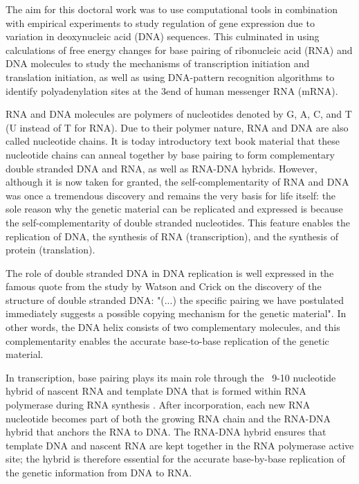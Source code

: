 %
The aim for this doctoral work was to use computational tools in combination
with empirical experiments to study regulation of gene expression due to
variation in deoxynucleic acid (DNA) sequences. This culminated in using
calculations of free energy changes for base pairing of ribonucleic acid (RNA)
and DNA molecules to study the mechanisms of transcription initiation and
translation initiation, as well as using DNA-pattern recognition algorithms to
identify polyadenylation sites at the 3\ppp end of human messenger RNA (mRNA).

RNA and DNA molecules are polymers of nucleotides denoted by G, A, C, and T (U
instead of T for RNA). Due to their polymer nature, RNA and DNA are also called
nucleotide chains. It is today introductory text book material that these
nucleotide chains can anneal together by base pairing to form complementary
double stranded DNA and RNA, as well as RNA-DNA hybrids. However, although it
is now taken for granted, the self-complementarity of RNA and DNA was once a
tremendous discovery and remains the very basis for life itself: the sole
reason why the genetic material can be replicated and expressed is because
the self-complementarity of double stranded nucleotides. This feature enables
the replication of DNA, the synthesis of RNA (transcription), and the synthesis
of protein (translation).

The role of double stranded DNA in DNA replication is well expressed in the
famous quote from the study by Watson and Crick \cite{watson_molecular_1953} on
the discovery of the structure of double stranded DNA: "(...) the specific
pairing we have postulated immediately suggests a possible copying mechanism
for the genetic material". In other words, the DNA helix consists of two
complementary molecules, and this complementarity enables the accurate
base-to-base replication of the genetic material.

In transcription, base pairing plays its main role through the ~9-10 nucleotide
hybrid of nascent RNA and template DNA that is formed within RNA polymerase
during RNA synthesis \cite{vassylyev_structural_2007}. After incorporation,
each new RNA nucleotide becomes part of both the growing RNA chain and the
RNA-DNA hybrid that anchors the RNA to DNA. The RNA-DNA hybrid ensures that
template DNA and nascent RNA are kept together in the RNA polymerase active
site; the hybrid is therefore essential for the accurate base-by-base
replication of the genetic information from DNA to RNA.

